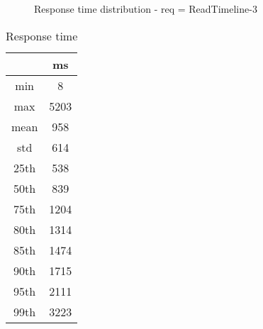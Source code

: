 \begin{minipage}{0.75\linewidth}
\begin{figure}[h]
\begin{adjustbox}{max width=1.0\linewidth, keepaspectratio}
  \end{adjustbox}
  \caption{Response time distribution - req = ReadTimeline-3}
\end{figure}
\end{minipage}\hfill\begin{minipage}{0.18\linewidth}
\begin{table}[h]
\begin{tabular}{|cc|}
\hline
\textbf{} & \textbf{ms}\\ \hline
 \Xhline{0.005\arrayrulewidth}
min & 8\\
 \Xhline{0.005\arrayrulewidth}
max & 5203\\
 \Xhline{0.005\arrayrulewidth}
mean & 958\\
 \Xhline{0.005\arrayrulewidth}
std & 614\\
\hline
\hline
 \Xhline{0.005\arrayrulewidth}
25th & 538\\
 \Xhline{0.005\arrayrulewidth}
50th & 839\\
 \Xhline{0.005\arrayrulewidth}
75th & 1204\\
 \Xhline{0.005\arrayrulewidth}
80th & 1314\\
 \Xhline{0.005\arrayrulewidth}
85th & 1474\\
 \Xhline{0.005\arrayrulewidth}
90th & 1715\\
 \Xhline{0.005\arrayrulewidth}
95th & 2111\\
 \Xhline{0.005\arrayrulewidth}
99th & 3223\\
\hline
\end{tabular}
\caption{Response time}
\end{table}
\end{minipage}\hfill